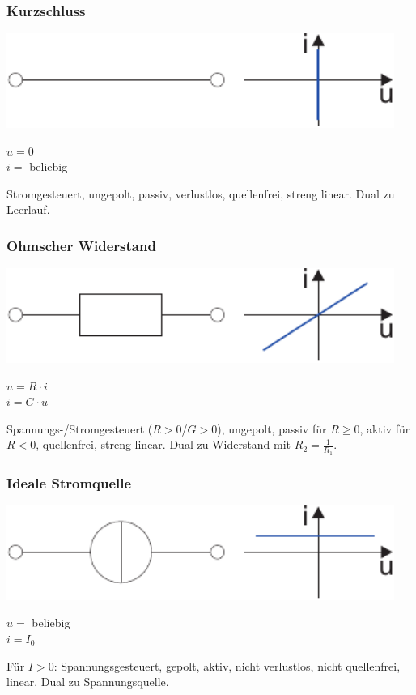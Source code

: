 \documentclass[a4paper,twocolumn,10pt]{article}
\begin{document}
\subsubsection*{Kurzschluss}
\begin{minipage}[b]{0.26\textwidth}
\includegraphics[width=0.95\textwidth]{Grafiken/Kurzschluss}
\end{minipage}
\hfill
\begin{minipage}[b]{0.2\textwidth}
$u=0$\\
$i=$ beliebig
\end{minipage}
Stromgesteuert, ungepolt, passiv, verlustlos, quellenfrei, streng linear. Dual zu Leerlauf.

\subsubsection*{Ohmscher Widerstand}
\begin{minipage}[b]{0.26\textwidth}
\includegraphics[width=0.95\textwidth]{Grafiken/Widerstand}
\end{minipage}
\hfill
\begin{minipage}[b]{0.2\textwidth}
$u=R\cdot i$\\
$i=G\cdot u$
\end{minipage}
Spannungs-/Stromgesteuert ($R>0$/$G>0$), ungepolt, passiv für $R\ge 0$, aktiv für $R<0$, quellenfrei, streng linear. Dual zu Widerstand mit $R_2=\frac{1}{R_1}$.

\subsubsection*{Ideale Stromquelle}
\begin{minipage}[b]{0.26\textwidth}
\includegraphics[width=0.95\textwidth]{Grafiken/Stromquelle}
\end{minipage}
\hfill
\begin{minipage}[b]{0.2\textwidth}
$u=$ beliebig\\
$i=I_0$
\end{minipage}
Für $I>0$: Spannungsgesteuert, gepolt, aktiv, nicht verlustlos, nicht quellenfrei, linear. Dual zu Spannungsquelle.
\end{document}
